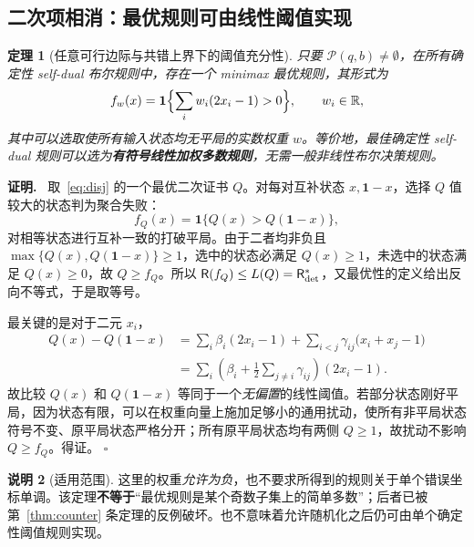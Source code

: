 \documentclass[11pt,a4paper]{ctexart}
\newtheorem{theorem}{定理}[section]
\theoremstyle{definition}
\newtheorem{remark}[theorem]{说明}
\newenvironment{proofcn}{\par\noindent\textbf{证明.}\ }{\hfill $\square$\par}
\newcommand{\calP}{\mathcal P}
\newcommand{\one}{\mathbf 1}
\newcommand{\Risk}{\mathsf R}
\begin{document}
\subsection{二次项相消：最优规则可由线性阈值实现}
\begin{theorem}[任意可行边际与共错上界下的阈值充分性]\label{thm:threshold}
只要 $\calP(q,b)\ne\emptyset$，在所有确定性 self-dual 布尔规则中，存在一个 minimax 最优规则，其形式为
\begin{equation}\label{eq:threshold}
f_w(x)=\one\Bigl\{\sum_iw_i(2x_i-1)>0\Bigr\},\qquad w_i\in\mathbb R,
\end{equation}
其中可以选取使所有输入状态均无平局的实数权重 $w$。等价地，最佳确定性 self-dual 规则可以选为\textbf{有符号线性加权多数规则}，无需一般非线性布尔决策规则。
\end{theorem}
\begin{proofcn}
取~\eqref{eq:disj} 的一个最优二次证书 $Q$。对每对互补状态 $x,\one-x$，选择 $Q$ 值较大的状态判为聚合失败：
\[
f_Q(x)=\one\{Q(x)>Q(\one-x)\},
\]
对相等状态进行互补一致的打破平局。由于二者均非负且 $\max\{Q(x),Q(\one-x)\}\ge1$，选中的状态必满足 $Q(x)\ge1$，未选中的状态满足 $Q(x)\ge0$，故 $Q\ge f_Q$。所以 $\Risk(f_Q)\le L(Q)=\Risk^*_{\rm det}$，又最优性的定义给出反向不等式，于是取等号。

最关键的是对于二元 $x_i$，
\begin{align*}
Q(x)-Q(\one-x)
&=\sum_i\beta_i(2x_i-1)
+\sum_{i<j}\gamma_{ij}\bigl(x_i+x_j-1\bigr)\\
&=\sum_i\left(\beta_i+\frac12\sum_{j\ne i}\gamma_{ij}\right)(2x_i-1).
\end{align*}
故比较 $Q(x)$ 和 $Q(\one-x)$ 等同于一个\emph{无偏置}的线性阈值。若部分状态刚好平局，因为状态有限，可以在权重向量上施加足够小的通用扰动，使所有非平局状态符号不变、原平局状态严格分开；所有原平局状态均有两侧 $Q\ge1$，故扰动不影响 $Q\ge f_Q$。得证。
\end{proofcn}

\begin{remark}[适用范围]
这里的权重\emph{允许为负}，也不要求所得到的规则关于单个错误坐标单调。该定理\textbf{不等于}“最优规则是某个奇数子集上的简单多数”；后者已被第~\ref{thm:counter} 条定理的反例破坏。也不意味着允许随机化之后仍可由单个确定性阈值规则实现。
\end{remark}
\end{document}
